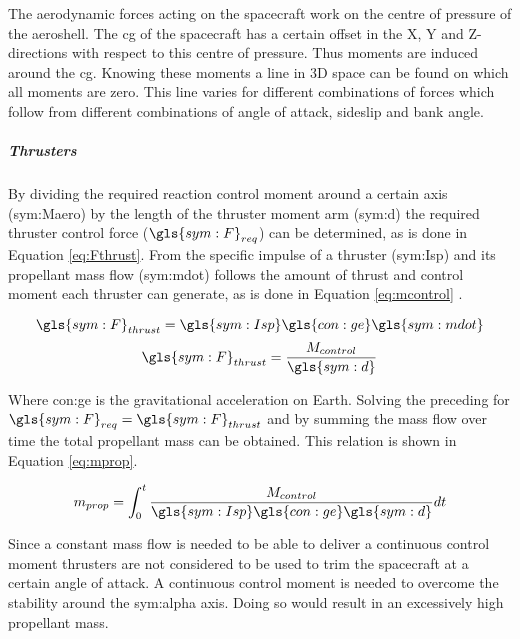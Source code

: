 The aerodynamic forces acting on the spacecraft work on the centre of pressure of the aeroshell. The \gls{cg} of the spacecraft has a certain offset in the X, Y and Z-directions with respect to this centre of pressure. Thus moments are induced around the \gls{cg}. Knowing these moments a line in 3D space can be found on which all moments are zero. This line varies for different combinations of forces which follow from different combinations of angle of attack, sideslip and bank angle.

\subparagraph{Thrusters}
\label{subpar:thrusters}

By dividing the required reaction control moment around a certain axis (\gls{sym:Maero}) by the length of the thruster moment arm (\gls{sym:d}) the required thruster control force ($\gls{sym:F}_{req}$) can be determined, as is done in Equation \ref{eq:Fthrust}. From the specific impulse of a thruster (\gls{sym:Isp}) and its propellant mass flow (\gls{sym:mdot}) follows the amount of thrust and control moment each thruster can generate, as is done in Equation \ref{eq:mcontrol} \cite{Allen2012}.
\begin{multicols}{2}
\begin{equation}
\gls{sym:F}_{thrust}=\gls{sym:Isp}\gls{con:ge}\gls{sym:mdot}
\label{eq:Fthrust}
\end{equation}
\begin{equation} \label{eq:mcontrol}
\gls{sym:F}_{thrust}=\frac{M_{control}}{\gls{sym:d}}
\end{equation}
\end{multicols}
Where \gls{con:ge} is the gravitational acceleration on Earth. Solving the preceding for $\gls{sym:F}_{req}=\gls{sym:F}_{thrust}$ and by summing the mass flow over time the total propellant mass can be obtained. This relation is shown in Equation \ref{eq:mprop}.

\begin{equation}
m_{prop} = \int_{0}^{t} \frac{M_{control}}{\gls{sym:Isp}\gls{con:ge}\gls{sym:d}} dt
\label{eq:mprop}
\end{equation}

Since a constant mass flow is needed to be able to deliver a continuous control moment thrusters are not considered to be used to trim the spacecraft at a certain angle of attack. A continuous control moment is needed to overcome the stability around the \gls{sym:alpha} axis. Doing so would result in an excessively high propellant mass.

